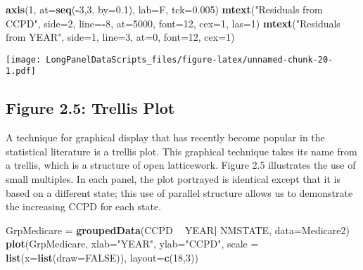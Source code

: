 \documentclass[]{book}
\newenvironment{Shaded}{\begin{snugshade}}{\end{snugshade}}
\newcommand{\DataTypeTok}[1]{\textcolor[rgb]{0.13,0.29,0.53}{#1}}
\newcommand{\DecValTok}[1]{\textcolor[rgb]{0.00,0.00,0.81}{#1}}
\newcommand{\FloatTok}[1]{\textcolor[rgb]{0.00,0.00,0.81}{#1}}
\newcommand{\KeywordTok}[1]{\textcolor[rgb]{0.13,0.29,0.53}{\textbf{#1}}}
\newcommand{\NormalTok}[1]{#1}
\newcommand{\OperatorTok}[1]{\textcolor[rgb]{0.81,0.36,0.00}{\textbf{#1}}}
\newcommand{\OtherTok}[1]{\textcolor[rgb]{0.56,0.35,0.01}{#1}}
\newcommand{\StringTok}[1]{\textcolor[rgb]{0.31,0.60,0.02}{#1}}
\begin{document}
\begin{Shaded}
\begin{Highlighting}[]
\KeywordTok{axis}\NormalTok{(}\DecValTok{1}\NormalTok{, }\DataTypeTok{at=}\KeywordTok{seq}\NormalTok{(}\OperatorTok{-}\DecValTok{3}\NormalTok{,}\DecValTok{3}\NormalTok{, }\DataTypeTok{by=}\FloatTok{0.1}\NormalTok{), }\DataTypeTok{lab=}\NormalTok{F, }\DataTypeTok{tck=}\FloatTok{0.005}\NormalTok{)}
\KeywordTok{mtext}\NormalTok{(}\StringTok{"Residuals from CCPD"}\NormalTok{, }\DataTypeTok{side=}\DecValTok{2}\NormalTok{, }\DataTypeTok{line=}\OperatorTok{-}\DecValTok{8}\NormalTok{, }\DataTypeTok{at=}\DecValTok{5000}\NormalTok{, }\DataTypeTok{font=}\DecValTok{12}\NormalTok{, }\DataTypeTok{cex=}\DecValTok{1}\NormalTok{, }\DataTypeTok{las=}\DecValTok{1}\NormalTok{)}
\KeywordTok{mtext}\NormalTok{(}\StringTok{"Residuals from YEAR"}\NormalTok{, }\DataTypeTok{side=}\DecValTok{1}\NormalTok{, }\DataTypeTok{line=}\DecValTok{3}\NormalTok{, }\DataTypeTok{at=}\DecValTok{0}\NormalTok{, }\DataTypeTok{font=}\DecValTok{12}\NormalTok{, }\DataTypeTok{cex=}\DecValTok{1}\NormalTok{)}
\end{Highlighting}
\end{Shaded}

\texttt{[image: LongPanelDataScripts\_files/figure-latex/unnamed-chunk-20-1.pdf]}

\hypertarget{figure-2.5-trellis-plot}{%
\subsection{Figure 2.5: Trellis Plot}\label{figure-2.5-trellis-plot}}

A technique for graphical display that has recently become popular in the statistical literature is a trellis plot. This graphical technique takes its name from a trellis, which is a structure of open latticework.
Figure 2.5 illustrates the use of small multiples. In each panel, the plot portrayed is identical except that it is based on a different state; this use of
parallel structure allows us to demonstrate the increasing CCPD for each state.

\begin{Shaded}
\begin{Highlighting}[]
\NormalTok{GrpMedicare =}\StringTok{ }\KeywordTok{groupedData}\NormalTok{(CCPD }\OperatorTok{~}\StringTok{ }\NormalTok{YEAR}\OperatorTok{|}\StringTok{ }\NormalTok{NMSTATE, }\DataTypeTok{data=}\NormalTok{Medicare2)}
\KeywordTok{plot}\NormalTok{(GrpMedicare, }\DataTypeTok{xlab=}\StringTok{"YEAR"}\NormalTok{, }\DataTypeTok{ylab=}\StringTok{"CCPD"}\NormalTok{, }\DataTypeTok{scale =} \KeywordTok{list}\NormalTok{(}\DataTypeTok{x=}\KeywordTok{list}\NormalTok{(}\DataTypeTok{draw=}\OtherTok{FALSE}\NormalTok{)), }\DataTypeTok{layout=}\KeywordTok{c}\NormalTok{(}\DecValTok{18}\NormalTok{,}\DecValTok{3}\NormalTok{))}
\end{Highlighting}
\end{Shaded}
\end{document}
